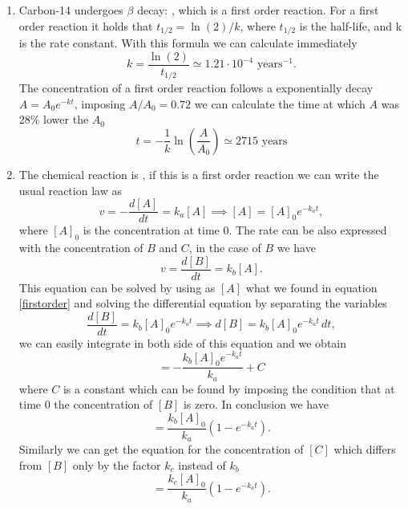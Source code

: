 \documentclass[a4paper,10pt]{article}
\begin{document}
\begin{enumerate}[label=\alph*)]
	\item Carbon-14 undergoes $\beta$ decay: , which is a first order reaction. For a first order reaction it holds that $t_{1/2} = \ln(2)/k$, where $t_{1/2}$ is the half-life, and k is the rate constant. With this formula we can calculate immediately 
	\begin{equation}k= \frac{\ln(2)}{t_{1/2}} \simeq 1.21\cdot10^{-4} \,\,\text{years}^{-1}.\end{equation}
	The concentration of a first order reaction follows a exponentially decay $A = A_0 e^{-kt}$, imposing $A/A_0 = 0.72$ we can calculate the time at which $A$ was 28\% lower the $A_0$
	\begin{equation}t = -\frac{1}{k}\ln\left(\frac{A}{A_0}\right) \simeq 2715  \,\,\text{years}\end{equation}
	\item The chemical reaction is , if this is a first order reaction we can write the usual reaction law as
	\begin{equation}\label{firstorder} v = -\frac{d[A]}{dt} = k_a [A] \implies [A] = [A]_0 e^{-k_a t},\end{equation}
	where $[A]_0$ is the concentration at time 0. The rate can be also expressed with the concentration of $B$ and $C$, in the case of $B$ we have
	\begin{equation}v = \frac{d[B]}{dt} = k_b [A].\end{equation}
	This equation can be solved by using as $[A]$ what we found in equation \eqref{firstorder} and solving the differential equation by separating the variables
	\begin{equation}\frac{d[B]}{dt} = k_b [A]_0 e^{-k_a t} \implies d[B] = k_b [A]_0 e^{-k_a t}\,dt,\end{equation}
	we can easily integrate in both side of this equation and we obtain
	\begin{equation}[B] = -\frac{k_b [A]_0 e^{-k_a t}}{k_a} + C\end{equation}
	where $C$ is a constant which can be found by imposing the condition that at time 0 the concentration of $[B]$ is zero. In conclusion we have
	\begin{equation}[B] = \frac{k_b [A]_0}{k_a}(1-e^{-k_a t}). \end{equation}
	Similarly we can get the equation for the concentration of $[C]$ which differs from $[B]$ only by the factor $k_c$ instead of $k_b$
	\begin{equation}[C] = \frac{k_c [A]_0}{k_a}(1-e^{-k_a t}).\end{equation}

\end{enumerate}
\end{document}
